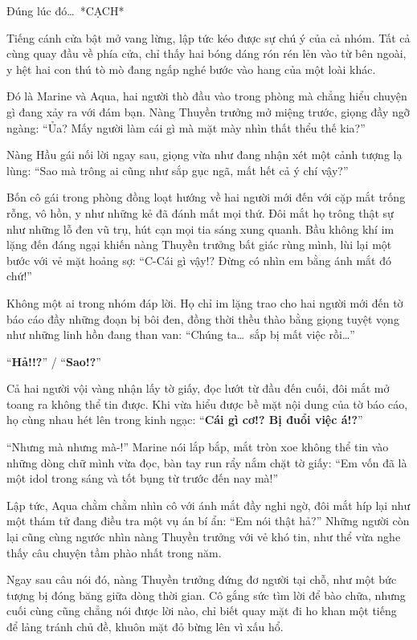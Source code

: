 \documentclass[../main.tex]{subfiles}
\begin{document}
Đúng lúc đó\dots\ *CẠCH*

Tiếng cánh cửa bật mở vang lừng, lập tức kéo được sự chú ý của cả nhóm. Tất cả cùng quay đầu về phía cửa, chỉ thấy hai bóng dáng rón rén lẻn vào từ bên ngoài, y hệt hai con thú tò mò đang ngấp nghé bước vào hang của một loài khác.

Đó là Marine và Aqua, hai người thò đầu vào trong phòng mà chẳng hiểu chuyện gì đang xảy ra với đám bạn. Nàng Thuyền trưởng mở miệng trước, giọng đầy ngỡ ngàng: ``Ủa? Mấy người làm cái gì mà mặt mày nhìn thất thểu thế kia?''

Nàng Hầu gái nối lời ngay sau, giọng vừa như đang nhận xét một cảnh tượng lạ lùng: ``Sao mà trông ai cũng như sắp gục ngã, mất hết cả ý chí vậy?''

Bốn cô gái trong phòng đồng loạt hướng về hai người mới đến với cặp mắt trống rỗng, vô hồn, y như những kẻ đã đánh mất mọi thứ. Đôi mắt họ trông thật sự như những lỗ đen vũ trụ, hút cạn mọi tia sáng xung quanh. Bầu không khí im lặng đến đáng ngại khiến nàng Thuyền trưởng bất giác rùng mình, lùi lại một bước với vẻ mặt hoảng sợ: ``C-Cái gì vậy!? Đừng có nhìn em bằng ánh mắt đó chứ!''


Không một ai trong nhóm đáp lời. Họ chỉ im lặng trao cho hai người mới đến tờ báo cáo đầy những đoạn bị bôi đen, đồng thời thều thào bằng giọng tuyệt vọng như những linh hồn đang than van: ``Chúng ta\dots\ sắp bị mất việc rồi\dots''

``\textbf{Hả!!?}'' / ``\textbf{Sao!?}''

Cả hai người vội vàng nhận lấy tờ giấy, đọc lướt từ đầu đến cuối, đôi mắt mở toang ra không thể tin được. Khi vừa hiểu được bề mặt nội dung của tờ báo cáo, họ cùng nhau hét lên trong kinh ngạc: ``\textbf{Cái gì cơ!? Bị đuổi việc á!?}''

``Nhưng mà nhưng mà-!'' Marine nói lắp bắp, mắt tròn xoe không thể tin vào những dòng chữ mình vừa đọc, bàn tay run rẩy nắm chặt tờ giấy: ``Em vốn đã là một idol trong sáng và tốt bụng từ trước đến nay mà!''

Lập tức, Aqua chằm chằm nhìn cô với ánh mắt đầy nghi ngờ, đôi mắt híp lại như một thám tử đang điều tra một vụ án bí ẩn: ``Em nói thật hả?'' Những người còn lại cũng cùng ngước nhìn nàng Thuyền trưởng với vẻ khó tin, như thể vừa nghe thấy câu chuyện tầm phào nhất trong năm.


Ngay sau câu nói đó, nàng Thuyền trưởng đứng đơ người tại chỗ, như một bức tượng bị đóng băng giữa dòng thời gian. Cô gắng sức tìm lời để bào chữa, nhưng cuối cùng cũng chẳng nói được lời nào, chỉ biết quay mặt đi ho khan một tiếng để lảng tránh chủ đề, khuôn mặt đỏ bừng lên vì xấu hổ.
\end{document}
